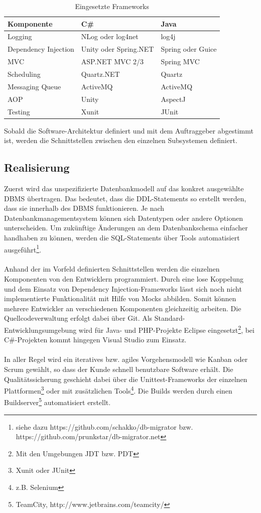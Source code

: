 \documentclass[a4paper,12pt]{scrreprt}
\begin{document}
\begin{table}[h]
\begin{tabular}{l|l|l}
Komponente 	& 		C\# 		&	 Java\\
\hline
Logging 	& NLog oder log4net & log4j \\
Dependency Injection & Unity oder Spring.NET & Spring oder Guice \\
MVC & ASP.NET MVC 2/3 & Spring MVC \\
Scheduling 	& Quartz.NET 		& Quartz 	\\
Messaging Queue & ActiveMQ 		& ActiveMQ 	 \\
AOP & Unity & AspectJ \\
Testing & Xunit & JUnit \\
\end{tabular}
\caption{\label{frameworks}Eingesetzte Frameworks}
\end{table}
Sobald die Software-Architektur definiert und mit dem Auftraggeber abgestimmt ist, werden die Schnittstellen zwischen den einzelnen Subsystemen definiert.
\subsection{Realisierung}
Zuerst wird das unspezifizierte Datenbankmodell auf das konkret ausgewählte DBMS übertragen. Das bedeutet, dass die DDL-Statements so erstellt werden, dass sie innerhalb des DBMS funktionieren. Je nach Datenbankmanagementsystem können sich Datentypen oder andere Optionen unterscheiden. Um zukünftige Änderungen an dem Datenbankschema einfacher handhaben zu können, werden die SQL-Statements über Tools automatisiert ausgeführt\footnote{siehe dazu https://github.com/schakko/db-migrator bzw. https://github.com/prunkstar/db-migrator.net}.
\\
\\ 
Anhand der im Vorfeld definierten Schnittstellen werden die einzelnen Komponenten von den Entwicklern programmiert. Durch eine lose Koppelung und dem Einsatz von Dependency Injection-Frameworks lässt sich noch nicht implementierte Funktionalität mit Hilfe von Mocks abbilden. Somit können mehrere Entwickler an verschiedenen Komponenten gleichzeitig arbeiten. Die Quellcodeverwaltung erfolgt dabei über Git.
Als Standard-Entwicklungsumgebung wird für Java- und PHP-Projekte Eclipse eingesetzt\footnote{Mit den Umgebungen JDT bzw. PDT}, bei C\#-Projekten kommt hingegen Visual Studio zum Einsatz.
\\
\\
In aller Regel wird ein iteratives bzw. agiles Vorgehensmodell wie Kanban oder Scrum gewählt, so dass der Kunde schnell benutzbare Software erhält. Die Qualitätssicherung geschieht dabei über die Unittest-Frameworks der einzelnen Plattformen\footnote{Xunit oder JUnit} oder mit zusätzlichen Tools\footnote{z.B. Selenium}. Die Builds werden durch einen Buildserver\footnote{TeamCity, http://www.jetbrains.com/teamcity/} automatisiert erstellt.
\end{document}
